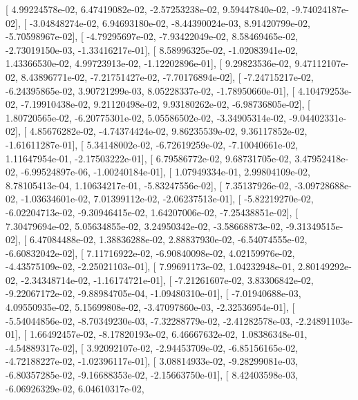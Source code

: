\documentclass{article}
\begin{document}
       [  4.99224578e-02,   6.47419082e-02,  -2.57253238e-02,
          9.59447840e-02,  -9.74024187e-02],
       [ -3.04848274e-02,   6.94693180e-02,  -8.44390024e-03,
          8.91420799e-02,  -5.70598967e-02],
       [ -4.79295697e-02,  -7.93422049e-02,   8.58469465e-02,
         -2.73019150e-03,  -1.33416217e-01],
       [  8.58996325e-02,  -1.02083941e-02,   1.43366530e-02,
          4.99723913e-02,  -1.12202896e-01],
       [  9.29823536e-02,   9.47112107e-02,   8.43896771e-02,
         -7.21751427e-02,  -7.70176894e-02],
       [ -7.24715217e-02,  -6.24395865e-02,   3.90721299e-03,
          8.05228337e-02,  -1.78950660e-01],
       [  4.10479253e-02,  -7.19910438e-02,   9.21120498e-02,
          9.93180262e-02,  -6.98736805e-02],
       [  1.80720565e-02,  -6.20775301e-02,   5.05586502e-02,
         -3.34905314e-02,  -9.04402331e-02],
       [  4.85676282e-02,  -4.74374424e-02,   9.86235539e-02,
          9.36117852e-02,  -1.61611287e-01],
       [  5.34148002e-02,  -6.72619259e-02,  -7.10040661e-02,
          1.11647954e-01,  -2.17503222e-01],
       [  6.79586772e-02,   9.68731705e-02,   3.47952418e-02,
         -6.99524897e-06,  -1.00240184e-01],
       [  1.07949334e-01,   2.99804109e-02,   8.78105413e-04,
          1.10634217e-01,  -5.83247556e-02],
       [  7.35137926e-02,  -3.09728688e-02,  -1.03634601e-02,
          7.01399112e-02,  -2.06237513e-01],
       [ -5.82219270e-02,  -6.02204713e-02,  -9.30946415e-02,
          1.64207006e-02,  -7.25438851e-02],
       [  7.30479694e-02,   5.05634855e-02,   3.24950342e-02,
         -3.58668873e-02,  -9.31349515e-02],
       [  6.47084488e-02,   1.38836288e-02,   2.88837930e-02,
         -6.54074555e-02,  -6.60832042e-02],
       [  7.11716922e-02,  -6.90840098e-02,   4.02159976e-02,
         -4.43575109e-02,  -2.25021103e-01],
       [  7.99691173e-02,   1.04232948e-01,   2.80149292e-02,
         -2.34348714e-02,  -1.16174721e-01],
       [ -7.21261607e-02,   3.83306842e-02,  -9.22067172e-02,
         -9.88984705e-04,  -1.09480310e-01],
       [ -7.01940688e-03,   4.09550935e-02,   5.15699808e-02,
         -3.47097860e-03,  -2.32536954e-01],
       [ -5.54044856e-02,  -8.70349230e-03,  -7.32288779e-02,
         -2.41282578e-03,  -2.24891103e-01],
       [  1.66492457e-02,  -8.17820193e-02,   6.46667632e-02,
          1.08386348e-01,  -4.54889317e-02],
       [  3.92092107e-02,  -2.94453709e-02,  -6.85156165e-02,
         -4.72188227e-02,  -1.02396117e-01],
       [  3.08814933e-02,  -9.28299081e-03,  -6.80357285e-02,
         -9.16688353e-02,  -2.15663750e-01],
       [  8.42403598e-03,  -6.06926329e-02,   6.04610317e-02,
\end{document}
